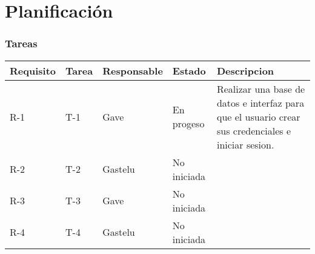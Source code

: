\chapter{Planificación}
\subsection{Tareas}
\begin{table}[htbp]
	\begin{center}
		\begin{tabular}{| p{1.8cm}| p{1.2cm}| p{2.4cm}|p{1.8cm} |p{7.8cm} |}
			\hline
			\textbf{Requisito} & \textbf{Tarea} & \textbf {Responsable}& \textbf{Estado} & \textbf{Descripcion}
			\\\hline  
			R-1&T-1&Gave&En progeso&Realizar una base de datos e interfaz para que el usuario crear sus credenciales e iniciar sesion.
			\\ \hline
			R-2&T-2&Gastelu&No iniciada&
			\\ \hline
			R-3&T-3&Gave&No iniciada&
			\\ \hline
			R-4&T-4&Gastelu&No iniciada&
			\\ \hline	
	\end{tabular}
\end{center}
\end{table}